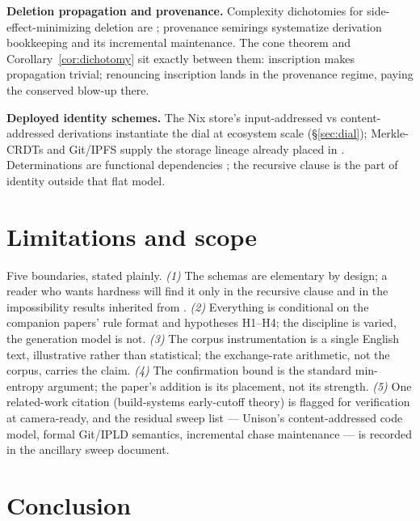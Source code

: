 \documentclass[10pt]{article}
\begin{document}
\textbf{Deletion propagation and provenance.} Complexity dichotomies for side-effect-minimizing deletion are \cite{BKT02,KVW12}; provenance semirings \cite{GKT07} systematize derivation bookkeeping and its incremental maintenance. The cone theorem and Corollary~\ref{cor:dichotomy} sit exactly between them: inscription makes propagation trivial; renouncing inscription lands in the provenance regime, paying the conserved blow-up there.

\textbf{Deployed identity schemes.} The Nix store's input-addressed vs content-addressed derivations \cite{Dolstra06,NixRFC062} instantiate the dial at ecosystem scale (\S\ref{sec:dial}); Merkle-CRDTs and Git/IPFS supply the storage lineage already placed in \cite{growth}. Determinations are functional dependencies \cite{Armstrong74}; the recursive clause is the part of identity outside that flat model.

\section{Limitations and scope}\label{sec:limitations}

Five boundaries, stated plainly. \emph{(1)} The schemas are elementary by design; a reader who wants hardness will find it only in the recursive clause and in the impossibility results inherited from \cite{growth,deletion}. \emph{(2)} Everything is conditional on the companion papers' rule format and hypotheses H1--H4; the discipline is varied, the generation model is not. \emph{(3)} The corpus instrumentation is a single English text, illustrative rather than statistical; the exchange-rate arithmetic, not the corpus, carries the claim. \emph{(4)} The confirmation bound is the standard min-entropy argument; the paper's addition is its placement, not its strength. \emph{(5)} One related-work citation (build-systems early-cutoff theory) is flagged for verification at camera-ready, and the residual sweep list --- Unison's content-addressed code model, formal Git/IPLD semantics, incremental chase maintenance --- is recorded in the ancillary sweep document.

\section{Conclusion}\label{sec:conclusion}
\end{document}
